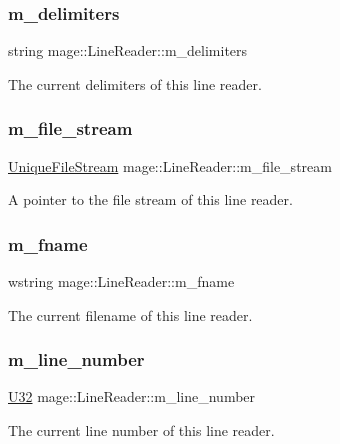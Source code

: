 \subsubsection{\texorpdfstring{m\+\_\+delimiters}{m\_delimiters}}
{\footnotesize\ttfamily string mage\+::\+Line\+Reader\+::m\+\_\+delimiters\hspace{0.3cm}{\ttfamily [private]}}

The current delimiters of this line reader. \mbox{\label{classmage_1_1_line_reader_a510ff5355c6d26d7c29dc692ef18a3e2}} 
\subsubsection{\texorpdfstring{m\+\_\+file\+\_\+stream}{m\_file\_stream}}
{\footnotesize\ttfamily \mbox{\hyperlink{namespacemage_a0ee1bd45ad7dbb3dc8c8e1770e3538d4}{Unique\+File\+Stream}} mage\+::\+Line\+Reader\+::m\+\_\+file\+\_\+stream\hspace{0.3cm}{\ttfamily [private]}}

A pointer to the file stream of this line reader. \mbox{\label{classmage_1_1_line_reader_ad6f55ba12fc610ab2fc1c26a48d12321}} 
\subsubsection{\texorpdfstring{m\+\_\+fname}{m\_fname}}
{\footnotesize\ttfamily wstring mage\+::\+Line\+Reader\+::m\+\_\+fname\hspace{0.3cm}{\ttfamily [private]}}

The current filename of this line reader. \mbox{\label{classmage_1_1_line_reader_ab145590a7e115106c0987905fde98393}} 
\subsubsection{\texorpdfstring{m\+\_\+line\+\_\+number}{m\_line\_number}}
{\footnotesize\ttfamily \mbox{\hyperlink{namespacemage_a41c104c036fba3756a74e19f793eeaa1}{U32}} mage\+::\+Line\+Reader\+::m\+\_\+line\+\_\+number\hspace{0.3cm}{\ttfamily [private]}}

The current line number of this line reader. 